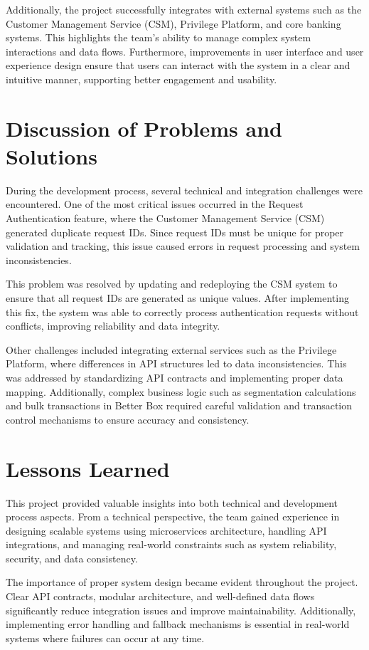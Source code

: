 \documentclass[12pt,oneside,openright,a4paper]{cpe-english-project}
\begin{document}
Additionally, the project successfully integrates with external systems
such as the Customer Management Service (CSM), Privilege Platform, and
core banking systems. This highlights the team's ability to manage
complex system interactions and data flows. Furthermore, improvements in
user interface and user experience design ensure that users can interact
with the system in a clear and intuitive manner, supporting better
engagement and usability.

\section{Discussion of Problems and Solutions}

During the development process, several technical and integration
challenges were encountered. One of the most critical issues occurred in
the Request Authentication feature, where the Customer Management
Service (CSM) generated duplicate request IDs. Since request IDs must be
unique for proper validation and tracking, this issue caused errors in
request processing and system inconsistencies.

This problem was resolved by updating and redeploying the CSM system to
ensure that all request IDs are generated as unique values. After
implementing this fix, the system was able to correctly process
authentication requests without conflicts, improving reliability and
data integrity.

Other challenges included integrating external services such as the
Privilege Platform, where differences in API structures led to data
inconsistencies. This was addressed by standardizing API contracts and
implementing proper data mapping. Additionally, complex business logic
such as segmentation calculations and bulk transactions in Better Box
required careful validation and transaction control mechanisms to ensure
accuracy and consistency.

\section{Lessons Learned}

This project provided valuable insights into both technical and
development process aspects. From a technical perspective, the team
gained experience in designing scalable systems using microservices
architecture, handling API integrations, and managing real-world
constraints such as system reliability, security, and data consistency.

The importance of proper system design became evident throughout the
project. Clear API contracts, modular architecture, and well-defined
data flows significantly reduce integration issues and improve
maintainability. Additionally, implementing error handling and fallback
mechanisms is essential in real-world systems where failures can occur
at any time.
\end{document}
